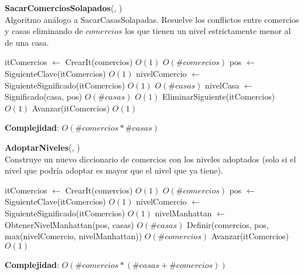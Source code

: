 \begin{Algoritmos}
\begin{algorithm}[H]{\textbf{SacarComerciosSolapados}(, )}
\\ {\small Algoritmo análogo a SacarCasasSolapadas. Resuelve los conflictos entre comercios y casas eliminando de $comercios$ los que tienen un nivel estrictamente menor al de una casa.}
\begin{algorithmic}[1]
    \State itComercios $\gets$ CrearIt(comercios) \Comment $O(1)$
     \Comment $O(\#comercios)$
        \State pos $\gets$ SiguienteClave(itComercios) \Comment $O(1)$
        \State nivelComercio $\gets$ SiguienteSignificado(itComercios) \Comment $O(1)$
         \Comment $O(\#casas)$
            \State nivelCasa $\gets$ Significado(casa, pos) \Comment $O(\#casas)$
             \Comment $O(1)$
                \State EliminarSiguiente(itComercios) \Comment $O(1)$
            \EndIf
        \EndIf
        \State Avanzar(itComercios) \Comment $O(1)$
    \EndWhile
\end{algorithmic}
\textbf{Complejidad}: $O(\#comercios * \#casas)$
\end{algorithm}

\begin{algorithm}[H]{\textbf{AdoptarNiveles}(, )}
\\ {\small Construye un nuevo diccionario de comercios con los niveles adoptados (solo si el nivel que podría adoptar es mayor que el nivel que ya tiene).}
\begin{algorithmic}[1]
    \State itComercios $\gets$ CrearIt(comercios) \Comment $O(1)$
     \Comment $O(\#comercios)$
        \State pos $\gets$ SiguienteClave(itComercios) \Comment $O(1)$
        \State nivelComercio $\gets$ SiguienteSignificado(itComercios) \Comment $O(1)$
        \State nivelManhattan $\gets$ ObtenerNivelManhattan(pos, casas) \Comment $O(\#casas)$
        \State Definir(comercios, pos, max(nivelComercio, nivelManhattan)) \Comment $O(\#comercios)$
        \State Avanzar(itComercios) \Comment $O(1)$
    \EndWhile
\end{algorithmic}
\textbf{Complejidad}: $O(\#comercios * (\#casas + \#comercios))$
\end{algorithm}


\end{Algoritmos}
